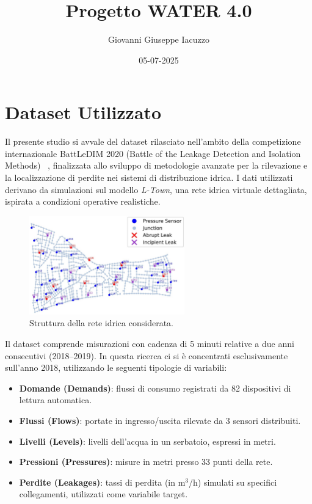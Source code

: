 \documentclass{article}
\title{Progetto WATER 4.0}
\author{Giovanni Giuseppe Iacuzzo}
\date{05-07-2025}
\begin{document}
\maketitle

\section{Dataset Utilizzato}

Il presente studio si avvale del dataset rilasciato nell'ambito della competizione internazionale BattLeDIM 2020 (Battle of the Leakage Detection and Isolation Methods) ~\cite{battle2020}, finalizzata allo sviluppo di metodologie avanzate per la rilevazione e la localizzazione di perdite nei sistemi di distribuzione idrica. I dati utilizzati derivano da simulazioni sul modello \emph{L-Town}, una rete idrica virtuale dettagliata, ispirata a condizioni operative realistiche.

\begin{figure}[htbp]
    \centering
    \includegraphics[width=0.6\textwidth]{img/struttura della rete.png}
    \caption{Struttura della rete idrica considerata.}
    \label{fig:network_structure}
\end{figure}

Il dataset comprende misurazioni con cadenza di 5 minuti relative a due anni consecutivi (2018--2019). 
In questa ricerca ci si è concentrati esclusivamente sull'anno 2018, utilizzando le seguenti tipologie 
di variabili:
\begin{itemize}
    \item \textbf{Domande (Demands)}: flussi di consumo registrati da 82 dispositivi di lettura automatica.
    \item \textbf{Flussi (Flows)}: portate in ingresso/uscita rilevate da 3 sensori distribuiti.
    \item \textbf{Livelli (Levels)}: livelli dell’acqua in un serbatoio, espressi in metri.
    \item \textbf{Pressioni (Pressures)}: misure in metri presso 33 punti della rete.
    \item \textbf{Perdite (Leakages)}: tassi di perdita (in m$^3$/h) simulati su specifici collegamenti, utilizzati come variabile target.
\end{itemize}
\end{document}
